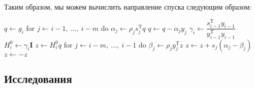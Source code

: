 \documentclass[12pt, a4paper, oneside, final]{article}
\begin{document}
\begin{enumerate}[1)]
\begin{itemize}
		\end{itemize}
		Таким образом, мы можем вычислить направление спуска следующим образом:
		\begin{mylisting}
			$q \gets g_{i}$
			for $j \gets i - 1, ~ \ldots, ~ i - m$ do
				$\alpha_{j} \gets \rho_{j}s_{j}^{\mathrm{T}}q$
				$q \gets q - \alpha_{j}y_{j}$
			$\gamma_{i} \gets \dfrac{s_{i - 1}^{\mathrm{T}}y_{i - 1}}{y^{\mathrm{T}}_{i - 1}y_{i - 1}}$
			$H_{i}^{0} \gets \gamma_{i}\mathbf{I}$
			$z \gets H_{i}^{0}q$
			for $j \gets i - m, ~ \ldots, ~ i - 1$ do
				$\beta_{j} \gets \rho_{j}y_{j}^{\mathrm{T}}z$
				$z \gets z + s_{j}(\alpha_{j} - \beta_{j})$
			$z \gets -z$
		\end{mylisting}
	\end{enumerate}
	\subsection*{Исследования}
\end{document}
